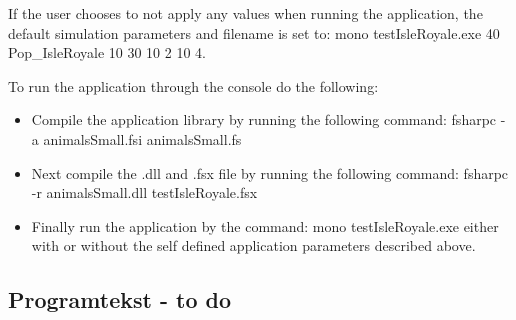 \documentclass[a4paper]{report}
\begin{document}
If the user chooses to not apply any values when running the application, the default simulation parameters and filename is set to: mono testIsleRoyale.exe 40 Pop\_IsleRoyale 10 30 10 2 10 4.

To run the application through the console do the following:

\begin{itemize}
\item Compile the application library by running the following command: fsharpc -a animalsSmall.fsi animalsSmall.fs
\item Next compile the .dll and .fsx file by running the following command: fsharpc -r animalsSmall.dll testIsleRoyale.fsx
\item Finally run the application by the command: mono testIsleRoyale.exe either with or without the self defined application parameters described above.
\end{itemize}

\subsection*{Programtekst - to do}
\end{document}
